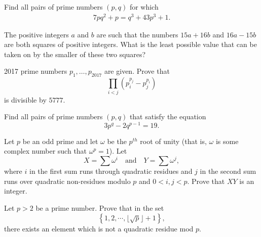 \documentclass{subfile}
\begin{document}
	\begin{problem} %
		Find all pairs of prime numbers $(p,q)$ for which
		\begin{align*}
		7pq^2 + p = q^3 + 43p^3 + 1.
		\end{align*}
	\end{problem}
	
	\begin{problem} [IMO 1996] %
		The positive integers $ a$ and $ b$ are such that the numbers $ 15a + 16b$ and $ 16a - 15b$ are both squares of positive integers. What is the least possible value that can be taken on by the smaller of these two squares?
	\end{problem}
	
	\begin{problem} %
		2017 prime numbers $p_1,\ldots,p_{2017}$ are given. Prove that $$\prod_{i<j} (p_i^{p_j}-p_j^{p_i})$$ is divisible by $5777$.
	\end{problem}
	
	\begin{problem}[Ukraine 2014] %
		Find all pairs of prime numbers $(p,q)$ that satisfy the equation $$3p^{q}-2q^{p-1}=19.$$
	\end{problem}
	
	\begin{problem} %
		Let $p$ be an odd prime and let $\omega$ be the $p^{th}$ root of unity (that is, $\omega$ is some complex number such that $\omega^p = 1$). Let $$X=\sum \omega^i \quad \text{and} \quad Y=\sum \omega^j,$$ where $i$ in the first sum runs through quadratic residues and $j$ in the second sum runs over quadratic non-residues modulo $p$ and $0<i,j<p$. Prove that $XY$ is an integer.
	\end{problem}
	
	\begin{problem} %
		Let $p>2$ be a prime number. Prove that in the set $$\left\{1,2, \cdots ,\lfloor{\sqrt{p}}\rfloor+1\right\},$$ there exists an element which is not a quadratic residue mod $p$.
	\end{problem}
	
\end{document}
